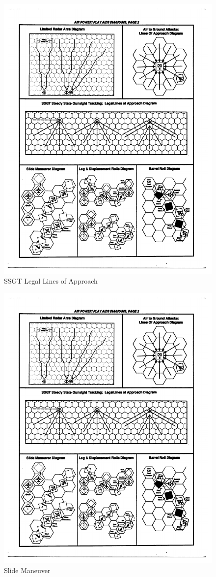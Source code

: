 \documentclass[10pt]{article}
\begin{document}
\begin{figure}
\centering
\caption{SSGT Legal Lines of Approach}
\medskip
\includegraphics[width=1.0\linewidth]{figures/aids-ssgt.pdf}
\end{figure}

\begin{figure}
\centering
\caption{Slide Maneuver}
\medskip
\includegraphics[width=0.6\linewidth]{figures/aids-slide.pdf}
\end{figure}
\end{document}
